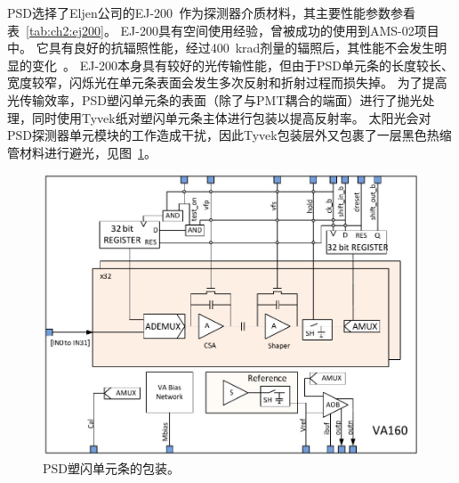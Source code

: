 PSD选择了Eljen公司的EJ-200~\parencite{ej-200}作为探测器介质材料，其主要性能参数参看表~\ref{tab:ch2:ej200}。
EJ-200具有空间使用经验，曾被成功的使用到AMS-02项目中。
它具有良好的抗辐照性能，经过\SI{400}{\kilo\radian}剂量的辐照后，其性能不会发生明显的变化~\parencite{ams02_tof}。
EJ-200本身具有较好的光传输性能，但由于PSD单元条的长度较长、宽度较窄，闪烁光在单元条表面会发生多次反射和折射过程而损失掉。
为了提高光传输效率，PSD塑闪单元条的表面（除了与PMT耦合的端面）进行了抛光处理，同时使用Tyvek纸对塑闪单元条主体进行包装以提高反射率。
太阳光会对PSD探测器单元模块的工作造成干扰，因此Tyvek包装层外又包裹了一层黑色热缩管材料进行避光，见图~\ref{fig:ch2:bar_wrapping}。

\begin{figure}
\centering
\includegraphics[width=0.8\linewidth]{chap/description/fig/va160}
\caption{PSD塑闪单元条的包装。}
\label{fig:ch2:bar_wrapping}
\end{figure}


